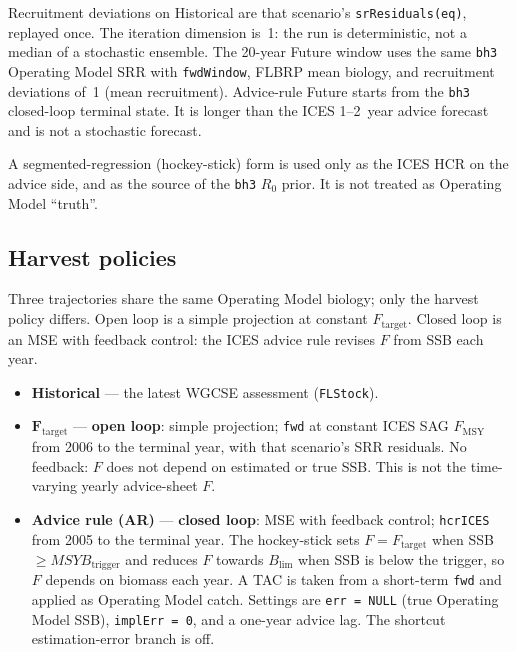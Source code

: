 \documentclass[11pt,a4paper]{article}
\newcommand{\Fmsy}{F_{\mathrm{MSY}}}
\newcommand{\Blim}{B_{\lim}}
\newcommand{\Btrig}{MSYB_{\mathrm{trigger}}}
\newcommand{\Ftar}{F_{\mathrm{target}}}
\begin{document}
Recruitment deviations on Historical are that scenario's
\texttt{srResiduals(eq)}, replayed once. The iteration dimension is~1:
the run is deterministic, not a median of a stochastic ensemble. The
20-year Future window uses the same \texttt{bh3} Operating Model SRR
with \texttt{fwdWindow}, FLBRP mean biology, and recruitment deviations
of~1 (mean recruitment). Advice-rule Future starts from the
\texttt{bh3} closed-loop terminal state. It is longer than the ICES
1--2~year advice forecast and is not a stochastic forecast.

A segmented-regression (hockey-stick) form \citep{mesnil2010hockeystick}
is used only as the ICES HCR on the advice side, and as the source of
the \texttt{bh3} $R_0$ prior. It is not treated as Operating Model
``truth''.

\subsection{Harvest policies}
\label{sec:policies}

Three trajectories share the same Operating Model biology; only the
harvest policy differs. Open loop is a simple projection at constant
$F_{\mathrm{target}}$. Closed loop is an MSE with feedback control: the
ICES advice rule revises $F$ from SSB each year.

\begin{itemize}
  \item \textbf{Historical} --- the latest WGCSE assessment
        (\texttt{FLStock}).
  \item $\boldsymbol{F}_{\mathrm{target}}$ --- \textbf{open loop}:
        simple projection; \texttt{fwd} at constant ICES SAG $\Fmsy$
        from 2006 to the terminal year, with that scenario's SRR residuals.
        No feedback: $F$ does not depend on estimated or true SSB. This
        is not the time-varying yearly advice-sheet $F$.
  \item \textbf{Advice rule (AR)} --- \textbf{closed loop}: MSE with
        feedback control; \texttt{hcrICES} from 2005 to the terminal
        year. The hockey-stick sets $F = \Ftar$ when SSB $\ge\Btrig$ and
        reduces $F$ towards $\Blim$ when SSB is below the trigger, so
        $F$ depends on biomass each year. A TAC is taken from a
        short-term \texttt{fwd} and applied as Operating Model catch.
        Settings are \texttt{err = NULL} (true Operating Model SSB),
        \texttt{implErr = 0}, and a one-year advice lag. The shortcut
        estimation-error branch is off.
\end{itemize}
\end{document}
